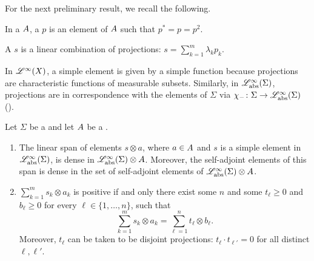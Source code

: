 For the next preliminary result, we recall the following.
\begin{definition}
	In a \cstar{} ${A}$, a  $p$ is an element of ${A}$ such that $p^*=p=p^2$.

	A  $s$ is a linear combination of projections: $s=\sum_{k=1}^m \lambda_k p_k$.
\end{definition}
In $\mathscr{L}^{\infty}(X)$, a simple element is given by a simple function because projections are characteristic functions of measurable subsets.
Similarly, in $\mathscr{L}_{\operatorname{abs}}^{\infty}(\Sigma)$, projections are in correspondence with the elements of $\Sigma$ via $\chi_{-}\colon \Sigma \to \mathscr{L}_{\operatorname{abs}}^{\infty}(\Sigma)$ (\cite[Lemma 4.1.26]{fritz2025categories}).

\begin{lemma}\label{lem:technical_simple_els}
	Let $\Sigma$ be a \bsigma{} and let ${A}$ be a \cstars{}.
	\begin{enumerate}
		\item\label{it:simple_els_dense} The linear span of elements $s\otimes a$, where $a\in {A}$ and $s$ is a simple element in $\mathscr{L}_{\operatorname{abs}}^{\infty}(\Sigma)$, is dense in $\mathscr{L}_{\operatorname{abs}}^{\infty}(\Sigma)\otimes {A}$.
		      Moreover, the self-adjoint elements of this span is dense in the set of self-adjoint elements of $\mathscr{L}_{\operatorname{abs}}^{\infty}(\Sigma)\otimes {A}$.
		\item\label{it:simple_els_positivity} $\sum_{k=1}^m s_k \otimes a_k$ is positive if and only there exist some $n$ and some $t_{\ell}\ge 0$ and $b_{\ell}\ge 0$ for every $\ell \in \lbrace 1, \dots , n\rbrace$, such that
		      \[
			      \sum_{k=1}^m s_k \otimes a_k = \sum_{\ell=1}^n t_{\ell} \otimes b_{\ell}.
		      \]
		      Moreover, $t_{\ell}$ can be taken to be disjoint projections: $t_{\ell}\cdot t_{\ell'}=0$ for all distinct $\ell,\ell'$.
	\end{enumerate}
\end{lemma}
